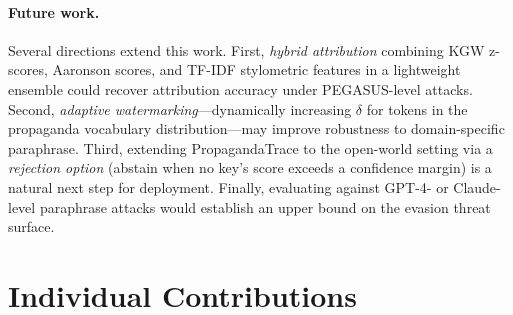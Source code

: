 \documentclass[11pt]{article}
\begin{document}
\paragraph{Future work.}
Several directions extend this work.
First, \emph{hybrid attribution} combining KGW z-scores, Aaronson scores,
and TF-IDF stylometric features in a lightweight ensemble could recover
attribution accuracy under PEGASUS-level attacks.
Second, \emph{adaptive watermarking}---dynamically increasing $\delta$ for
tokens in the propaganda vocabulary distribution---may improve robustness to
domain-specific paraphrase.
Third, extending PropagandaTrace to the open-world setting via a
\emph{rejection option} (abstain when no key's score exceeds a confidence
margin) is a natural next step for deployment.
Finally, evaluating against GPT-4- or Claude-level paraphrase attacks would
establish an upper bound on the evasion threat surface.

\section*{Individual Contributions}
\label{sec:contributions}
\end{document}
